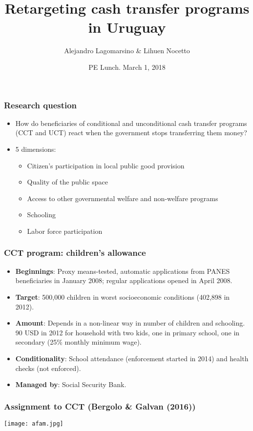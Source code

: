 \documentclass{beamer}
\title[Retargeting cash transfers programs] %
{Retargeting cash transfer programs in Uruguay}
\author[Alejandro Lagomarsino] %
{Alejandro Lagomarsino \& Lihuen Nocetto\inst{*} }
\institute[Harvard University] %
{
	\inst{*}%
	Harvard University\\
	Pontifical Catholic University of Chile
}
\date[March. 2018] %
{PE Lunch. March 1, 2018}
\begin{document}
	\setlength{\parindent}{10pt}
	
	\frame{\titlepage}

\begin{frame}
		\frametitle{Research question}
		\begin{itemize}
			\item How do beneficiaries of conditional and unconditional cash transfer programs (CCT and UCT) react when the government stops transferring them money?
			\item 5 dimensions:
			\begin{itemize}
				\item Citizen's participation in local public good provision
				\item Quality of the public space
				\item Access to other governmental welfare and non-welfare programs
				\item Schooling
				\item Labor force participation
			\end{itemize}
		\end{itemize}
\end{frame}

\begin{frame}
		\frametitle{CCT program: children's allowance}
		\begin{itemize}
			\item \textbf{Beginnings}: Proxy means-tested, automatic applications from PANES beneficiaries in January 2008; regular applications opened in April 2008.
			\item \textbf{Target}: 500,000 children in worst socioeconomic conditions (402,898 in 2012).
			\item \textbf{Amount}: Depends in a non-linear way in number of children and schooling. 90 USD in 2012 for household with two kids, one in primary school, one in secondary (25\% monthly minimum wage).
			\item \textbf{Conditionality}: School attendance (enforcement started in 2014) and health checks (not enforced).
			\item \textbf{Managed by}: Social Security Bank.	
		\end{itemize}
\end{frame}

\begin{frame}
\frametitle{Assignment to CCT (Bergolo \& Galvan (2016))}
\begin{center}
	\texttt{[image: afam.jpg]}
	\label{afam}
\end{center}
\end{frame}
\end{document}
